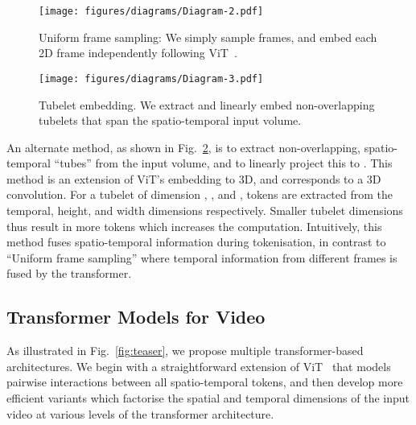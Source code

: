 \documentclass[10pt,twocolumn,letterpaper]{article}
\makeatletter
\renewcommand{\paragraph}{\@startsection{paragraph}{4}{\z@}{1.625ex \@plus 1ex \@minus .2ex}{-1em}{\normalfont\normalsize\bfseries}}
\makeatother
\begin{document}
\paragraph{Tubelet embedding}
\begin{figure}
    \centering
     \texttt{[image: figures/diagrams/Diagram-2.pdf]}
    \caption{Uniform frame sampling: We simply sample  frames, and embed each 2D frame independently following ViT~\cite{dosovitskiy_iclr_2021}.}
    \label{fig:tokenizer_2d}
\end{figure} \begin{figure}
    \centering
    \texttt{[image: figures/diagrams/Diagram-3.pdf]}
    \caption{Tubelet embedding. We extract and linearly embed non-overlapping tubelets that span the spatio-temporal input volume. }
    \vspace{-3mm}
    \label{fig:tokenizer_3d}
\end{figure} An alternate method, as shown in Fig.~\ref{fig:tokenizer_3d}, is to extract non-overlapping, spatio-temporal ``tubes'' from the input volume, and to linearly project this to .
This method is an extension of ViT's embedding to 3D, and corresponds to a 3D convolution.
For a tubelet of dimension , ,  and , tokens are extracted from the temporal, height, and width dimensions respectively.
Smaller tubelet dimensions thus result in more tokens which increases the computation. Intuitively, this method fuses spatio-temporal information during tokenisation, in contrast to ``Uniform frame sampling'' where temporal information from different frames is fused by the transformer.


\subsection{Transformer Models for Video}
\label{sec:method_video_models}

As illustrated in Fig.~\ref{fig:teaser}, we propose multiple transformer-based architectures.
We begin with a straightforward extension of ViT~\cite{dosovitskiy_iclr_2021} that models pairwise interactions between all spatio-temporal tokens, and then develop more efficient variants which factorise the spatial and temporal dimensions of the input video at various levels of the transformer architecture.
\end{document}
